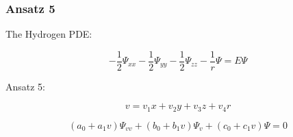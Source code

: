 \documentclass[11pt]{beamer}
\begin{document}
\begin{frame}
\frametitle{Ansatz 5}

\begin{center}

The Hydrogen PDE:

\[ - \frac{1}{2} \Psi_{xx} - \frac{1}{2} \Psi_{yy} - \frac{1}{2} \Psi_{zz} - \frac{1}{r} \Psi = E \Psi \]

\vskip 10pt

Ansatz 5:

\begin{equation*}
\label{ansatz 5a}
v = v_1 x + v_2 y + v_3 z + v_4 r
\end{equation*}

\begin{equation*}
\label{ansatz 5b}
(a_0 + a_1 v) \Psi_{vv} + (b_0 + b_1 v) \Psi_v + (c_0 + c_1 v) \Psi = 0
\end{equation*}

\end{center}

\end{frame}
\end{document}
